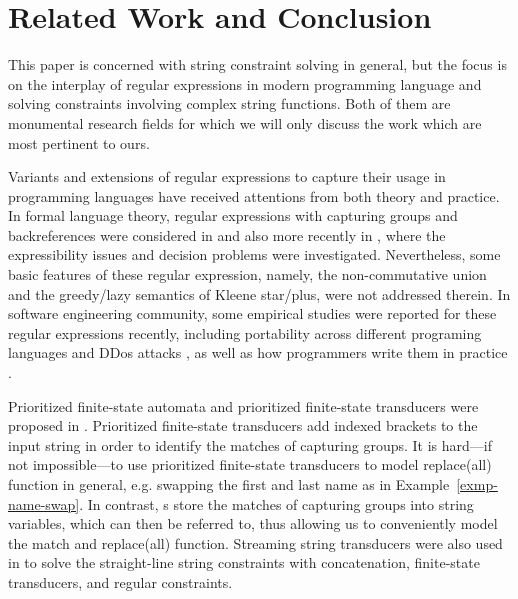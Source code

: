 
\section{Related Work and Conclusion}\label{sec-related}


This paper is concerned with string constraint solving in general, but the focus is on the interplay of regular expressions in modern programming language and solving constraints involving complex string functions. Both of them are monumental research fields for which we will only discuss the work which are most pertinent to ours. 

Variants and extensions of regular expressions to capture their usage in programming languages have received attentions %
from both theory and practice. In formal language theory, regular expressions with capturing groups and backreferences were considered in \cite{CSY03,CN09} and also more recently in \cite{Freydenberger13,Schmid16,BM17b,FS19}, where the expressibility issues and decision problems were investigated. Nevertheless, some basic features of these regular expression, namely, the non-commutative union and the greedy/lazy semantics of Kleene star/plus, were not addressed therein. In software engineering community, %
some empirical studies were reported for these regular expressions recently, including portability across different programing languages \cite{DMC+19} and DDos attacks \cite{SP18}, as well as how programmers write them in practice \cite{MDD+19}.


Prioritized finite-state automata and prioritized finite-state transducers were proposed in \cite{BM17}. Prioritized finite-state transducers add indexed brackets to the input string in order to identify the matches of capturing groups. It is hard---if not impossible---to use prioritized finite-state transducers to model replace(all) function in general, e.g. swapping the first and last name as in Example~\ref{exmp-name-swap}. In contrast, {\PSST}s store the matches of capturing groups into string variables, which can then be referred to, thus allowing us to conveniently model the match and replace(all) function. 
%
Streaming string transducers were also used in \cite{ZAM19} to solve the straight-line string constraints with concatenation, finite-state transducers, and regular constraints.

